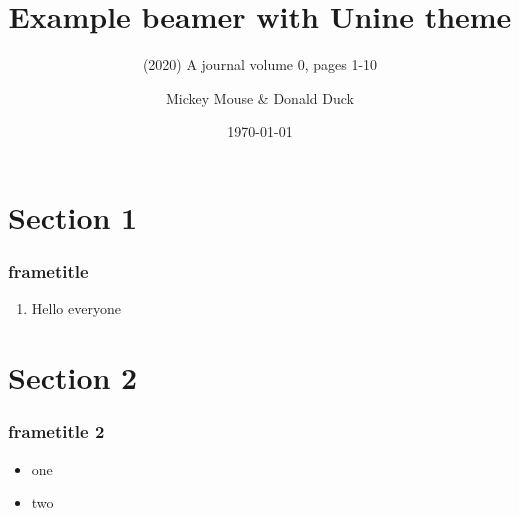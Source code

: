 \documentclass{beamer}
\title{Example beamer with Unine theme}
\subtitle{(2020) A journal volume 0, pages 1-10}
\author[Mickey Mouse]{Mickey Mouse \& Donald Duck}
\date{\today}
\begin{document}
	
	\begin{frame}
		\titlepage
	\end{frame}

\begin{frame}
	\tableofcontents
\end{frame}
	
	\section{Section 1}
	\begin{frame} 
		\frametitle{frametitle} 
	
		\begin{enumerate} 
			\item Hello everyone
		\end{enumerate}
	\end{frame}
	
	\section{Section 2}
	\begin{frame}
		\frametitle{frametitle 2}
		\begin{itemize}
			\item one
			\item two
		\end{itemize}
	\end{frame}
	
\end{document}
